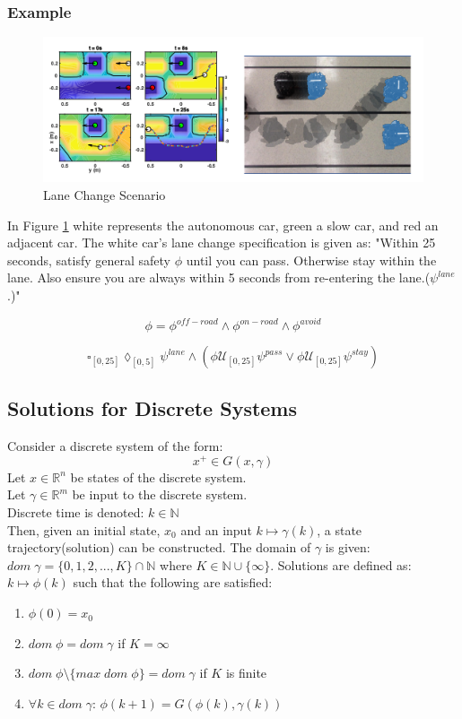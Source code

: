 \documentclass{article}
\theoremstyle{definition}
\begin{document}
\subsubsection{Example}
\begin{figure}[H] 
\centering
\includegraphics[width=4.5in]{Figures/chen_lanechange.png}
\caption{Lane Change Scenario}
\label{fig:chen_lane_change}
\end{figure}
In Figure \ref{fig:chen_lane_change} white represents the autonomous car, green a slow car, and red an adjacent car. The white car's lane change specification is given as: "Within 25 seconds, satisfy general safety $\phi$ until you can pass. Otherwise stay within the lane. Also ensure you are always within 5 seconds from re-entering the lane.($\psi^{lane}$.)"

\begin{equation}
    \phi = \phi^{off-road} \land \phi^{on-road} \land \phi^{avoid} 
\end{equation}

\begin{equation}
    \square_{[0,25]}\lozenge_{[0,5]}\psi^{lane} \land (\phi\mathcal{U}_{[0,25]}\psi^{pass} \lor \phi\mathcal{U}_{[0,25]}\psi^{stay})
\end{equation}


\subsection{Solutions for Discrete Systems}
Consider a discrete system of the form:
\begin{equation}
    x^{+} \in G(x,\gamma)
\end{equation}
Let $x \in \mathbb{R}^n$ be states of the discrete system.\\
Let $\gamma \in \mathbb{R}^m$ be input to the discrete system. \\
Discrete time is denoted: $k \in \mathbb{N}$\\
Then, given an initial state, $x_0$ and an input $k \mapsto \gamma(k)$, a state trajectory(solution)
can be constructed. The domain of $\gamma$ is given: $dom\;\gamma = \{0,1,2,...,K\}\cap \mathbb{N}$ where $K \in \mathbb{N} \cup \{\infty\}$. Solutions are defined as: $k \mapsto \phi(k)$ such that the following are satisfied:
\begin{enumerate}
    \item $\phi(0) = x_0$
    \item $dom\;\phi = dom\;\gamma$ if $K=\infty$
    \item $dom\;\phi \setminus \{max\; dom\;\phi\} = dom\;\gamma$ if $K$ is finite
    \item $\forall k \in dom\;\gamma$: $\phi(k+1) = G(\phi(k),\gamma(k))$
\end{enumerate}
\end{document}
